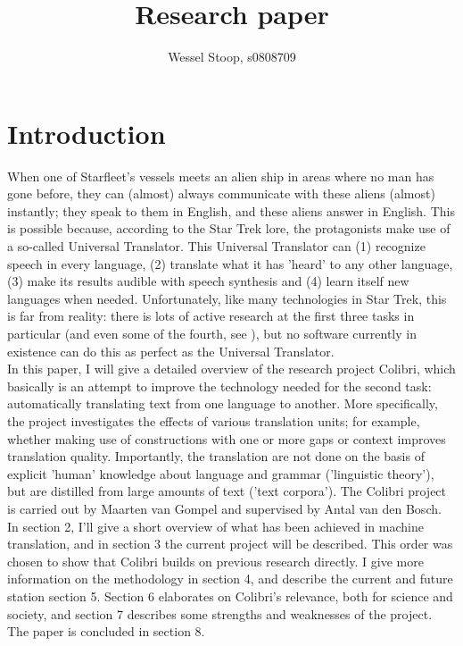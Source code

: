 \documentclass[12pt]{article}
\title{Research paper}
\author{Wessel Stoop, s0808709}
\begin{document}
\maketitle

\section{Introduction}

When one of Starfleet's vessels meets an alien ship in areas where no man has gone before, they can (almost) always communicate with these aliens (almost) instantly; they speak to them in English, and these aliens answer in English. This is possible because, according to the Star Trek lore, the protagonists make use of a so-called Universal Translator. This Universal Translator can (1) recognize speech in every language, (2) translate what it has 'heard' to any other language, (3) make its results audible with speech synthesis and (4) learn itself new languages when needed. Unfortunately, like many technologies in Star Trek, this is far from reality: there is lots of active research at the first three tasks in particular (and even some of the fourth, see \citet{biemann11}), but no software currently in existence can do this as perfect as the Universal Translator. \\\indent
In this paper, I will give a detailed overview of the research project Colibri, which basically is an attempt to improve the technology needed for the second task: automatically translating text from one language to another. More specifically, the project investigates the effects of various translation units; for example, whether making use of constructions with one or more gaps or context improves translation quality. Importantly, the translation are not done on the basis of explicit 'human' knowledge about language and grammar ('linguistic theory'), but are distilled from large amounts of text ('text corpora'). The Colibri project is carried out by Maarten van Gompel and supervised by Antal van den Bosch.
\\\indent
In section 2, I'll give a short overview of what has been achieved in machine translation, and in section 3 the current project will be described. This order was chosen to show that Colibri builds on previous research directly. I give more information on the methodology in section 4, and describe the current and future station section 5. Section 6 elaborates on Colibri's relevance, both for science and society, and section 7 describes some strengths and weaknesses of the project. The paper is concluded in section 8.
\end{document}

